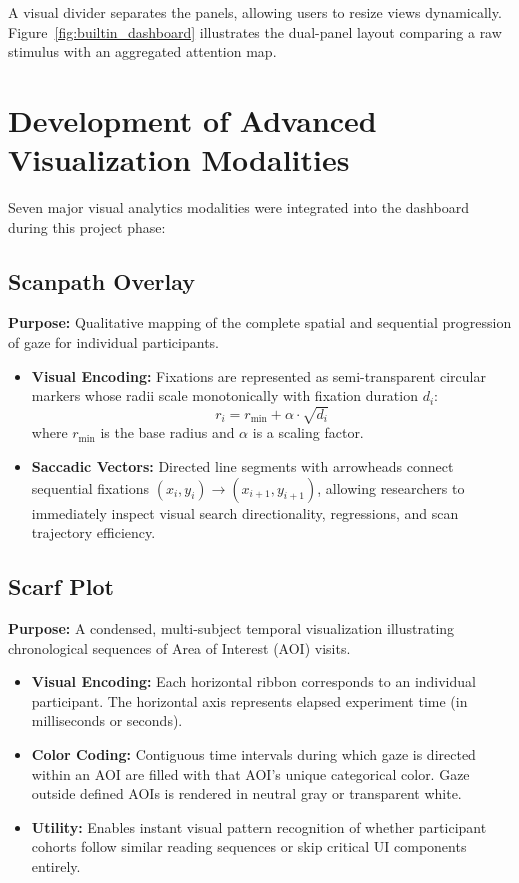 \documentclass[11pt,a4paper]{article}
\begin{document}
A visual divider separates the panels, allowing users to resize views dynamically. Figure~\ref{fig:builtin_dashboard} illustrates the dual-panel layout comparing a raw stimulus with an aggregated attention map.

\section{Development of Advanced Visualization Modalities}
\label{sec:visualizations}

Seven major visual analytics modalities were integrated into the dashboard during this project phase:

\subsection{Scanpath Overlay}
\textbf{Purpose:} Qualitative mapping of the complete spatial and sequential progression of gaze for individual participants.
\begin{itemize}[noitemsep,topsep=2pt]
    \item \textbf{Visual Encoding:} Fixations are represented as semi-transparent circular markers whose radii scale monotonically with fixation duration $d_i$:
    \begin{equation}
        r_i = r_{\text{min}} + \alpha \cdot \sqrt{d_i}
    \end{equation}
    where $r_{\text{min}}$ is the base radius and $\alpha$ is a scaling factor.
    \item \textbf{Saccadic Vectors:} Directed line segments with arrowheads connect sequential fixations $(x_i, y_i) \to (x_{i+1}, y_{i+1})$, allowing researchers to immediately inspect visual search directionality, regressions, and scan trajectory efficiency.
\end{itemize}

\subsection{Scarf Plot}
\textbf{Purpose:} A condensed, multi-subject temporal visualization illustrating chronological sequences of Area of Interest (AOI) visits.
\begin{itemize}[noitemsep,topsep=2pt]
    \item \textbf{Visual Encoding:} Each horizontal ribbon corresponds to an individual participant. The horizontal axis represents elapsed experiment time (in milliseconds or seconds).
    \item \textbf{Color Coding:} Contiguous time intervals during which gaze is directed within an AOI are filled with that AOI's unique categorical color. Gaze outside defined AOIs is rendered in neutral gray or transparent white.
    \item \textbf{Utility:} Enables instant visual pattern recognition of whether participant cohorts follow similar reading sequences or skip critical UI components entirely.
\end{itemize}
\end{document}
